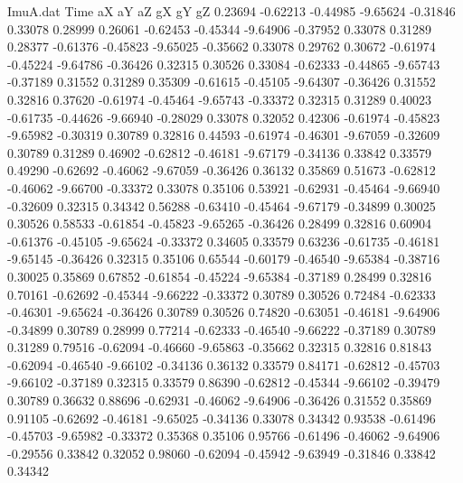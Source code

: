 \begin{filecontents}{ImuA.dat}
Time aX aY aZ gX gY gZ
   0.23694   -0.62213   -0.44985   -9.65624   -0.31846    0.33078    0.28999
   0.26061   -0.62453   -0.45344   -9.64906   -0.37952    0.33078    0.31289
   0.28377   -0.61376   -0.45823   -9.65025   -0.35662    0.33078    0.29762
   0.30672   -0.61974   -0.45224   -9.64786   -0.36426    0.32315    0.30526
   0.33084   -0.62333   -0.44865   -9.65743   -0.37189    0.31552    0.31289
   0.35309   -0.61615   -0.45105   -9.64307   -0.36426    0.31552    0.32816
   0.37620   -0.61974   -0.45464   -9.65743   -0.33372    0.32315    0.31289
   0.40023   -0.61735   -0.44626   -9.66940   -0.28029    0.33078    0.32052
   0.42306   -0.61974   -0.45823   -9.65982   -0.30319    0.30789    0.32816
   0.44593   -0.61974   -0.46301   -9.67059   -0.32609    0.30789    0.31289
   0.46902   -0.62812   -0.46181   -9.67179   -0.34136    0.33842    0.33579
   0.49290   -0.62692   -0.46062   -9.67059   -0.36426    0.36132    0.35869
   0.51673   -0.62812   -0.46062   -9.66700   -0.33372    0.33078    0.35106
   0.53921   -0.62931   -0.45464   -9.66940   -0.32609    0.32315    0.34342
   0.56288   -0.63410   -0.45464   -9.67179   -0.34899    0.30025    0.30526
   0.58533   -0.61854   -0.45823   -9.65265   -0.36426    0.28499    0.32816
   0.60904   -0.61376   -0.45105   -9.65624   -0.33372    0.34605    0.33579
   0.63236   -0.61735   -0.46181   -9.65145   -0.36426    0.32315    0.35106
   0.65544   -0.60179   -0.46540   -9.65384   -0.38716    0.30025    0.35869
   0.67852   -0.61854   -0.45224   -9.65384   -0.37189    0.28499    0.32816
   0.70161   -0.62692   -0.45344   -9.66222   -0.33372    0.30789    0.30526
   0.72484   -0.62333   -0.46301   -9.65624   -0.36426    0.30789    0.30526
   0.74820   -0.63051   -0.46181   -9.64906   -0.34899    0.30789    0.28999
   0.77214   -0.62333   -0.46540   -9.66222   -0.37189    0.30789    0.31289
   0.79516   -0.62094   -0.46660   -9.65863   -0.35662    0.32315    0.32816
   0.81843   -0.62094   -0.46540   -9.66102   -0.34136    0.36132    0.33579
   0.84171   -0.62812   -0.45703   -9.66102   -0.37189    0.32315    0.33579
   0.86390   -0.62812   -0.45344   -9.66102   -0.39479    0.30789    0.36632
   0.88696   -0.62931   -0.46062   -9.64906   -0.36426    0.31552    0.35869
   0.91105   -0.62692   -0.46181   -9.65025   -0.34136    0.33078    0.34342
   0.93538   -0.61496   -0.45703   -9.65982   -0.33372    0.35368    0.35106
   0.95766   -0.61496   -0.46062   -9.64906   -0.29556    0.33842    0.32052
   0.98060   -0.62094   -0.45942   -9.63949   -0.31846    0.33842    0.34342

\end{filecontents}
